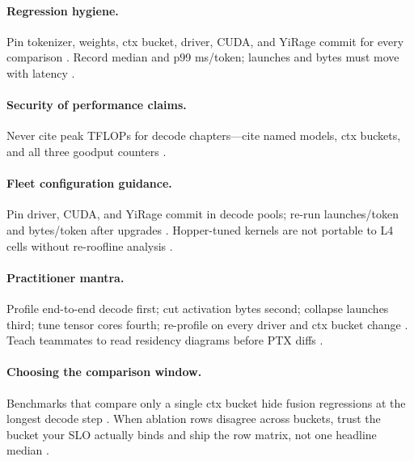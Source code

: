 \paragraph{Regression hygiene.}
Pin tokenizer, weights, ctx bucket, driver, CUDA, and YiRage commit for every comparison \citep{taxbreak2026,memoryfloor2026,yirage2026}.
Record median and p99 ms/token; launches and bytes must move with latency \citep{patel2025llminference,kwon2023vllm}.

\paragraph{Security of performance claims.}
Never cite peak TFLOPs for decode chapters---cite named models, ctx buckets, and all three goodput counters \citep{taxbreak2026,memoryfloor2026,dlbook,patel2025llminference}.

\paragraph{Fleet configuration guidance.}
Pin driver, CUDA, and YiRage commit in decode pools; re-run launches/token and bytes/token after upgrades \citep{taxbreak2026,memoryfloor2026,yirage2026,nvidia2024cudagraphs}.
Hopper-tuned kernels are not portable to L4 cells without re-roofline analysis \citep{memoryfloor2026,taxbreak2026,patel2025llminference}.

\paragraph{Practitioner mantra.}
Profile end-to-end decode first; cut activation bytes second; collapse launches third; tune tensor cores fourth; re-profile on every driver and ctx bucket change \citep{taxbreak2026,memoryfloor2026,patel2025llminference,semianalysis2024tma}.
Teach teammates to read residency diagrams before PTX diffs \citep{yirage2026,chen2020compilerbasedhardw}.

\paragraph{Choosing the comparison window.}
Benchmarks that compare only a single ctx bucket hide fusion regressions at the longest decode step \citep{memoryfloor2026,kwon2023vllm,taxbreak2026}.
When ablation rows disagree across buckets, trust the bucket your SLO actually binds and ship the row matrix, not one headline median \citep{patel2025llminference,yirage2026}.

